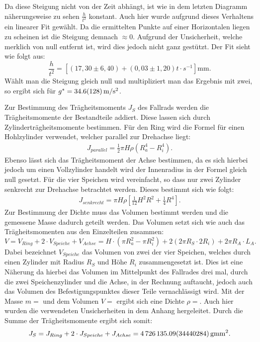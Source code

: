 Da diese Steigung nicht von der Zeit abhängt, ist wie in dem letzten Diagramm näherungsweise zu sehen $\frac{h}{t^2}$ konstant. Auch hier wurde aufgrund dieses Verhaltens ein linearer Fit gewählt. Da die ermittelten Punkte auf einer Horizontalen liegen zu scheinen ist die Steigung demnach $\approx 0$. Aufgrund der Unsicherheit, welche merklich von null entfernt ist, wird dies jedoch nicht ganz gestützt. Der Fit sieht wie folgt aus:
\begin{equation*}
\frac{h}{t^2} = [(17,30 \pm 6,40) + (0,03 \pm 1,20)t\cdot\si{s^{-1}}]\si{\mm}.
\end{equation*} 
Wählt man die Steigung gleich null und multipliziert man das Ergebnis mit zwei, so ergibt sich für $g^{*} = \SI{34,6+-12,8}{\m\per\s^2}$. 

Zur Bestimmung des Trägheitsmoments $J_S$ des Fallrads werden die Trägheitsmomente der Bestandteile addiert. Diese lassen sich durch Zylinderträgheitsmomente bestimmen. Für den Ring wird die Formel für einen Hohlzylinder verwendet, welcher parallel zur Drehachse liegt:
\begin{align}
J_{parallel} = \frac{1}{2}\pi H\rho(R_a^4-R_i^4). \label{eq:Trägpar}
\end{align}
Ebenso lässt sich das Trägheitsmoment der Achse bestimmen, da es sich hierbei jedoch um einen Vollzylinder handelt wird der Innenradius in der Formel gleich null gesetzt.
Für die vier Speichen wird vereinfacht, so dass nur zwei Zylinder senkrecht zur Drehachse betrachtet werden.
Dieses bestimmt sich wie folgt: 
\begin{align}
J_{senkrecht} = \pi H\rho\left[\frac{1}{12}H^2R^2+\frac{1}{4}R^4\right]. \label{eq:Trägsenk}
\end{align} 
Zur Bestimmung der Dichte muss das Volumen bestimmt werden und die gemessene Masse dadurch geteilt werden. Das Volumen setzt sich wie auch das Trägheitsmomenten aus den Einzelteilen zusammen:
\begin{equation}
V = V_{Ring} + 2\cdot V_{Speiche} + V_{Achse} = H\cdot(\pi R_a^2 - \pi R_i^2) + 2(2\pi R_S\cdot 2 R_i) + 2\pi R_A\cdot L_A.
\end{equation}
Dabei bezeichnet $V_{Speiche}$ das Volumen von zwei der vier Speichen, welches durch einen Zylinder mit Radius $R_S$ und Höhe $R_i$ zusammengesetzt ist. Dies ist eine Näherung da hierbei das Volumen im Mittelpunkt des Fallrades drei mal, durch die zwei Speichenzylinder und die Achse, in der Rechnung auftaucht, jedoch auch das Volumen des Befestigungspunktes dieser Teile vernachlässigt wird.
Mit der Masse $m=$ und dem Volumen $V=$ ergibt sich eine Dichte $\rho = $. Auch hier wurden die verwendeten Unsicherheiten in dem Anhang hergeleitet.
Durch die Summe der Trägheitsmomente ergibt sich somit:
\begin{equation}
J_S = J_{Ring} + 2\cdot J_{Speiche} + J_{Achse} = \SI{4726135,09+-344402,84}{\g\mm^2}.
\end{equation}

